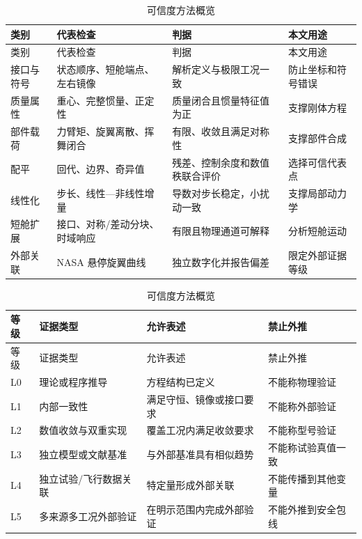 \documentclass[UTF8,12pt,oneside,openany,fontset=windows]{ctexbook}
\begin{document}
\begin{center}
\scriptsize
\setlength{\tabcolsep}{1pt}
\begin{longtable}{>{\raggedright\arraybackslash}p{}>{\raggedright\arraybackslash}p{}>{\raggedright\arraybackslash}p{}>{\raggedright\arraybackslash}p{}}
\caption{可信度方法概览}\\
\toprule
类别 & 代表检查 & 判据 & 本文用途 \\
\midrule\endfirsthead
\toprule
类别 & 代表检查 & 判据 & 本文用途 \\
\midrule\endhead
接口与符号 & 状态顺序、短舱端点、左右镜像 & 解析定义与极限工况一致 & 防止坐标和符号错误 \\
质量属性 & 重心、完整惯量、正定性 & 质量闭合且惯量特征值为正 & 支撑刚体方程 \\
部件载荷 & 力臂矩、旋翼离散、挥舞闭合 & 有限、收敛且满足对称性 & 支撑部件合成 \\
配平 & 回代、边界、奇异值 & 残差、控制余度和数值秩联合评价 & 选择可信代表点 \\
线性化 & 步长、线性—非线性增量 & 导数对步长稳定，小扰动一致 & 支撑局部动力学 \\
短舱扩展 & 接口、对称/差动分块、时域响应 & 有限且物理通道可解释 & 分析短舱运动 \\
外部关联 & NASA 悬停旋翼曲线 & 独立数字化并报告偏差 & 限定外部证据等级 \\
\bottomrule
\end{longtable}
\end{center}

\begin{center}
\scriptsize
\setlength{\tabcolsep}{1pt}
\begin{longtable}{>{\raggedright\arraybackslash}p{}>{\raggedright\arraybackslash}p{}>{\raggedright\arraybackslash}p{}>{\raggedright\arraybackslash}p{}}
\caption{可信度方法概览}\\
\toprule
等级 & 证据类型 & 允许表述 & 禁止外推 \\
\midrule\endfirsthead
\toprule
等级 & 证据类型 & 允许表述 & 禁止外推 \\
\midrule\endhead
L0 & 理论或程序推导 & 方程结构已定义 & 不能称物理验证 \\
L1 & 内部一致性 & 满足守恒、镜像或接口要求 & 不能称外部验证 \\
L2 & 数值收敛与双重实现 & 覆盖工况内满足收敛要求 & 不能称型号验证 \\
L3 & 独立模型或文献基准 & 与外部基准具有相似趋势 & 不能称试验真值一致 \\
L4 & 独立试验/飞行数据关联 & 特定量形成外部关联 & 不能传播到其他变量 \\
L5 & 多来源多工况外部验证 & 在明示范围内完成外部验证 & 不能外推到安全包线 \\
\bottomrule
\end{longtable}
\end{center}
\end{document}
